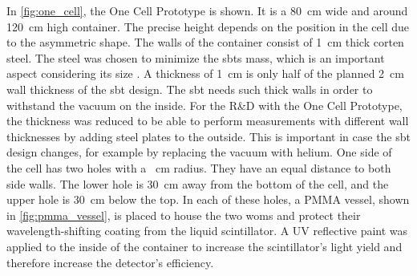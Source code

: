 In \autoref{fig:one_cell}, the One Cell Prototype is shown.
It is a \SI{80}{\centi\meter} wide and around \SI{120}{\centi\meter} high container.
The precise height depends on the position in the cell due to the asymmetric shape.
The walls of the container consist of \SI{1}{\centi\meter} thick corten steel.
The steel was chosen to minimize the \ac{sbt}s mass, which is an important aspect considering its size \cite{}.
A thickness of \SI{1}{\centi\meter} is only half of the planned \SI{2}{\centi\meter} wall thickness of the \ac{sbt} design.
The \ac{sbt} needs such thick walls in order to withstand the vacuum on the inside.
For the R\&D with the One Cell Prototype, the thickness was reduced to be able to perform measurements with different wall thicknesses by adding steel plates to the outside.
This is important in case the \ac{sbt} design changes, for example by replacing the vacuum with helium.
One side of the cell has two holes with a \SI{}{\centi\meter} radius.
They have an equal distance to both side walls.
The lower hole is \SI{30}{\centi\meter} away from the bottom of the cell, and the upper hole is \SI{30}{\centi\meter} below the top.
In each of these holes, a PMMA vessel, shown in \autoref{fig:pmma_vessel}, is placed to house the two \acp{wom} and protect their wavelength-shifting coating from the liquid scintillator.
A UV reflective paint was applied to the inside of the container to increase the scintillator's light yield and therefore increase the detector's efficiency.
